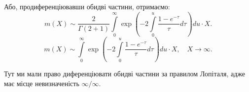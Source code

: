 Або, продиференціювавши обидві частини,  отримаємо:
\begin{equation}
	m(X) \sim \frac{2}{\Gamma(2 + 1)} \int\limits_0^\infty \exp\left( -2\int\limits_0^u \frac{1 - e^{-\tau}}{\tau} d\tau  \right) du \cdot X.
\end{equation}
\begin{equation}
	\label{eq:uniform_base_final}
	m(X) \sim  \int\limits_0^\infty \exp\left( -2\int\limits_0^u \frac{1 - e^{-\tau}}{\tau} d\tau  \right) du \cdot X, \quad X \rightarrow \infty.
\end{equation}

Тут ми мали право диференціювати обидві частини за правилом Лопіталя, адже має місце невизначеність $\infty / \infty$.

